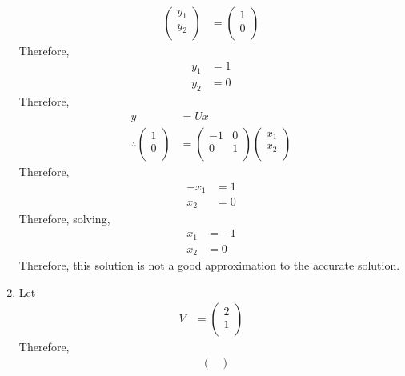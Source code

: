 \documentclass[fleqn, a4paper, 11pt, oneside]{amsart}
\theoremstyle{definition}
\theoremstyle{theorem}
\begin{document}
\begin{solution}
\begin{enumerate}[leftmargin=*]
\begin{align*}
					\begin{pmatrix}
						y_1 \\
						y_2 \\
					\end{pmatrix}
				&=
					\begin{pmatrix}
						1 \\
						0 \\
					\end{pmatrix}
			\end{align*}
			Therefore,
			\begin{align*}
				y_1 & = 1 \\
				y_2 & = 0
			\end{align*}
			Therefore,
			\begin{align*}
				y &= U x\\
				\therefore
					\begin{pmatrix}
						1 \\
						0 \\
					\end{pmatrix}
				&=
					\begin{pmatrix}
						-1 & 0 \\
						0  & 1 \\
					\end{pmatrix}
					\begin{pmatrix}
						x_1 \\
						x_2 \\
					\end{pmatrix}
			\end{align*}
			Therefore,
			\begin{align*}
				-x_1 & = 1 \\
				x_2  & = 0
			\end{align*}
			Therefore, solving,
			\begin{align*}
				x_1 & = -1 \\
				x_2 & = 0
			\end{align*}
			Therefore, this solution is not a good approximation to the accurate solution.
		\item
			Let
			\begin{align*}
				V &=
					\begin{pmatrix}
						2 \\
						1 \\
					\end{pmatrix}
			\end{align*}
			Therefore,
			\begin{align*}
				&
					\begin{pmatrix}

\end{pmatrix}
\end{align*}
\end{enumerate}
\end{solution}
\end{document}
